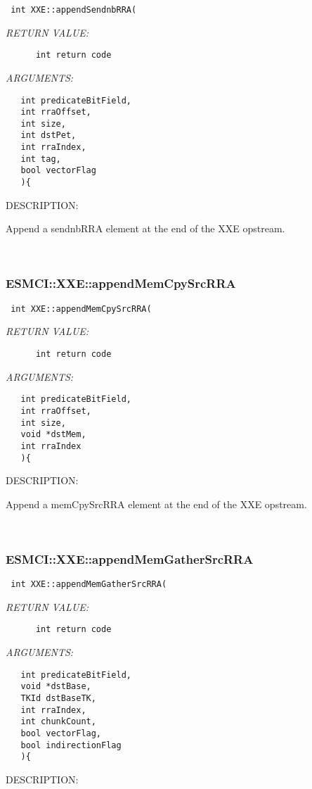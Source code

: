   
\begin{verbatim} int XXE::appendSendnbRRA(\end{verbatim}{\em RETURN VALUE:}
\begin{verbatim}      int return code\end{verbatim}{\em ARGUMENTS:}
\begin{verbatim}   int predicateBitField,
   int rraOffset,
   int size,
   int dstPet,
   int rraIndex,
   int tag,
   bool vectorFlag
   ){\end{verbatim}
{\sf DESCRIPTION:\\ }


    Append a sendnbRRA element at the end of the XXE opstream. 
 
\mbox{}\hrulefill\
 
\subsubsection [ESMCI::XXE::appendMemCpySrcRRA] {ESMCI::XXE::appendMemCpySrcRRA}


  
\begin{verbatim} int XXE::appendMemCpySrcRRA(\end{verbatim}{\em RETURN VALUE:}
\begin{verbatim}      int return code\end{verbatim}{\em ARGUMENTS:}
\begin{verbatim}   int predicateBitField,
   int rraOffset,
   int size,
   void *dstMem,
   int rraIndex
   ){\end{verbatim}
{\sf DESCRIPTION:\\ }


    Append a memCpySrcRRA element at the end of the XXE opstream. 
 
\mbox{}\hrulefill\
 
\subsubsection [ESMCI::XXE::appendMemGatherSrcRRA] {ESMCI::XXE::appendMemGatherSrcRRA}


  
\begin{verbatim} int XXE::appendMemGatherSrcRRA(\end{verbatim}{\em RETURN VALUE:}
\begin{verbatim}      int return code\end{verbatim}{\em ARGUMENTS:}
\begin{verbatim}   int predicateBitField,
   void *dstBase,
   TKId dstBaseTK,
   int rraIndex,
   int chunkCount,
   bool vectorFlag,
   bool indirectionFlag
   ){\end{verbatim}
{\sf DESCRIPTION:\\ }


